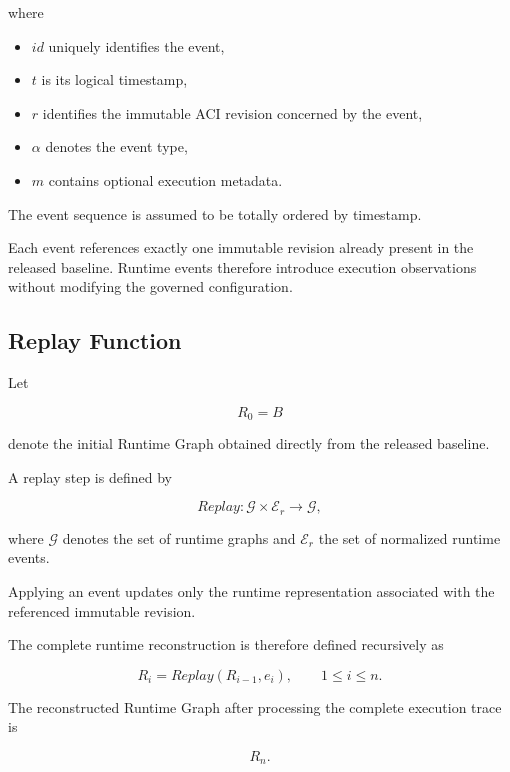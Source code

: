 \documentclass[10pt]{article}
\begin{document}
where

\begin{itemize}
	\item $id$ uniquely identifies the event,
	\item $t$ is its logical timestamp,
	\item $r$ identifies the immutable ACI revision concerned by the event,
	\item $\alpha$ denotes the event type,
	\item $m$ contains optional execution metadata.
\end{itemize}

The event sequence is assumed to be totally ordered by timestamp.

Each event references exactly one immutable revision already present in the
released baseline. Runtime events therefore introduce execution observations
without modifying the governed configuration.

\subsection{Replay Function}
\label{appendix:replay_function}

Let

\[
R_0=B
\]

denote the initial Runtime Graph obtained directly from the released baseline.

A replay step is defined by

\begin{equation}
Replay
:
\mathcal G
\times
\mathcal E_r
\rightarrow
\mathcal G,
\end{equation}

where $\mathcal G$ denotes the set of runtime graphs and
$\mathcal E_r$ the set of normalized runtime events.

Applying an event updates only the runtime representation associated with the
referenced immutable revision.

The complete runtime reconstruction is therefore defined recursively as

\begin{equation}
R_i
=
Replay
(
R_{i-1},
e_i
),
\qquad
1\le i\le n.
\end{equation}

The reconstructed Runtime Graph after processing the complete execution trace is

\[
R_n.
\]
\end{document}
